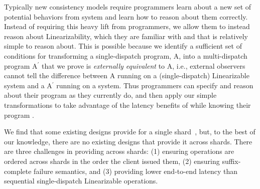 
Typically new consistency models require programmers learn about a new set of potential behaviors from system and learn how to reason about them correctly.
Instead of requiring this heavy lift from programmers, we allow them to instead reason about Linearizability, which they are familiar with and that is relatively simple to reason about.
This is possible because we identify a sufficient set of conditions for transforming a single-dispatch program, A, into a multi-dispatch program A$^\prime$ that we prove is \textit{externally equivalent} to A, i.e., external observers cannot tell the difference between A running on a (single-dispatch) Linearizable system and a A$^\prime$ running on a \mdl{} system.
Thus programmers can specify and reason about their program as they currently do, and then apply our simple transformations to take advantage of the latency benefits of \mdl{} while knowing their program .


We find that some existing designs provide \mdl{} for a single shard~\cite{ongaro_thesis}, but, to the best of our knowledge, there are no existing designs that provide it across shards.
There are three challenges in providing \mdl across shards:
(1) ensuring operations are ordered across shards in the order the client issued them,
(2) ensuring suffix-complete failure semantics,
and
(3) providing lower end-to-end latency than sequential single-dispatch Linearizable operations.

